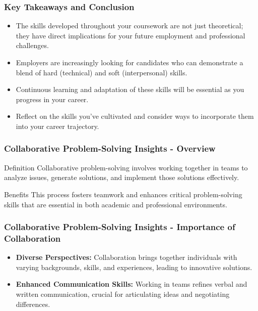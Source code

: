 \documentclass[aspectratio=169]{beamer}
\begin{document}
\begin{frame}[fragile]
    \frametitle{Key Takeaways and Conclusion}
    \begin{itemize}
        \item The skills developed throughout your coursework are not just theoretical; they have direct implications for your future employment and professional challenges.
        \item Employers are increasingly looking for candidates who can demonstrate a blend of hard (technical) and soft (interpersonal) skills.
        \item Continuous learning and adaptation of these skills will be essential as you progress in your career.
        \item Reflect on the skills you've cultivated and consider ways to incorporate them into your career trajectory.
    \end{itemize}
\end{frame}

\begin{frame}[fragile]
    \frametitle{Collaborative Problem-Solving Insights - Overview}
    \begin{block}{Definition}
        Collaborative problem-solving involves working together in teams to analyze issues, generate solutions, and implement those solutions effectively.
    \end{block}
    \begin{block}{Benefits}
        This process fosters teamwork and enhances critical problem-solving skills that are essential in both academic and professional environments.
    \end{block}
\end{frame}

\begin{frame}[fragile]
    \frametitle{Collaborative Problem-Solving Insights - Importance of Collaboration}
    \begin{itemize}
        \item \textbf{Diverse Perspectives:} Collaboration brings together individuals with varying backgrounds, skills, and experiences, leading to innovative solutions.
        \item \textbf{Enhanced Communication Skills:} Working in teams refines verbal and written communication, crucial for articulating ideas and negotiating differences.
    \end{itemize}
\end{frame}
\end{document}
